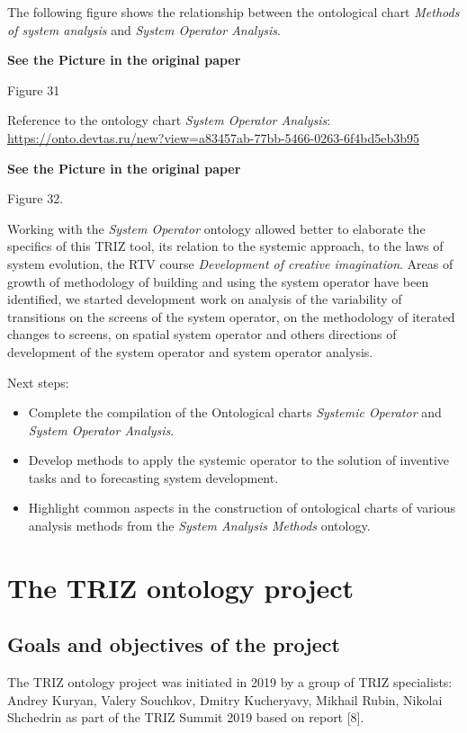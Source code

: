 \documentclass[11pt,a4paper]{article}
\newcommand{\addpicture}{\textbf{See the Picture in the original paper}\par}
\begin{document}
The following figure shows the relationship between the ontological chart
\emph{Methods of system analysis} and \emph{System Operator Analysis}.
\begin{center}
  \addpicture
  Figure 31
\end{center}
Reference to the ontology chart \emph{System Operator Analysis}:
\url{https://onto.devtas.ru/new?view=a83457ab-77bb-5466-0263-6f4bd5eb3b95}
\begin{center}
  \addpicture
  Figure 32.
\end{center}
Working with the \emph{System Operator} ontology allowed better to elaborate
the specifics of this TRIZ tool, its relation to the systemic approach, to the
laws of system evolution, the RTV course \emph{Development of creative
  imagination}. Areas of growth of methodology of building and using the
system operator have been identified, we started development work on analysis
of the variability of transitions on the screens of the system operator, on
the methodology of iterated changes to screens, on spatial system operator and
others directions of development of the system operator and system operator
analysis.

Next steps: 
\begin{itemize}
\item Complete the compilation of the Ontological charts \emph{Systemic
  Operator} and \emph{System Operator Analysis}.
\item Develop methods to apply the systemic operator to the solution of
  inventive tasks and to forecasting system development.
\item Highlight common aspects in the construction of ontological charts of
  various analysis methods from the \emph{System Analysis Methods} ontology.
\end{itemize}

\section{The TRIZ ontology project}

\subsection{Goals and objectives of the project}

The TRIZ ontology project was initiated in 2019 by a group of TRIZ
specialists: Andrey Kuryan, Valery Souchkov, Dmitry Kucheryavy, Mikhail Rubin,
Nikolai Shchedrin as part of the TRIZ Summit 2019 based on report [8].
\end{document}

